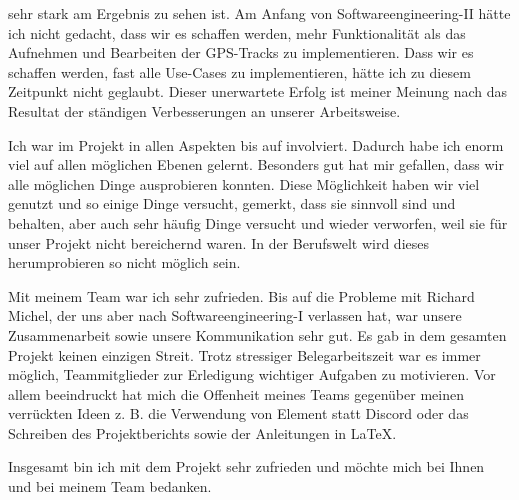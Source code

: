 \documentclass[10pt]{article}
\begin{document}
sehr stark am Ergebnis zu sehen ist. Am Anfang von Softwareengineering-II hätte ich nicht gedacht, dass wir es
schaffen werden, mehr Funktionalität als das Aufnehmen und Bearbeiten der GPS-Tracks zu implementieren.
Dass wir es schaffen werden, fast alle Use-Cases zu implementieren, hätte ich zu diesem Zeitpunkt nicht geglaubt.
Dieser unerwartete Erfolg ist meiner Meinung nach das Resultat der ständigen Verbesserungen an unserer Arbeitsweise.\par
\medskip
Ich war im Projekt in allen Aspekten bis auf  involviert.
Dadurch habe ich enorm viel auf allen möglichen Ebenen gelernt. Besonders gut hat mir gefallen, dass wir
alle möglichen Dinge ausprobieren konnten. Diese Möglichkeit haben wir viel genutzt und so einige Dinge versucht,
gemerkt, dass sie sinnvoll sind und behalten, aber auch sehr häufig Dinge versucht und wieder verworfen, weil sie für
unser Projekt nicht bereichernd waren.
In der Berufswelt wird dieses herumprobieren so nicht möglich sein.\par
\medskip
Mit meinem Team war ich sehr zufrieden. Bis auf die Probleme mit Richard Michel, der uns aber nach Softwareengineering-I
verlassen hat, war unsere Zusammenarbeit sowie unsere Kommunikation sehr gut. Es gab in dem gesamten Projekt keinen
einzigen Streit. Trotz stressiger Belegarbeitszeit war es
immer möglich, Teammitglieder zur Erledigung wichtiger Aufgaben zu motivieren. Vor allem beeindruckt hat mich die
Offenheit meines Teams gegenüber meinen verrückten Ideen z. B. die Verwendung von Element statt Discord oder
das Schreiben des Projektberichts sowie der Anleitungen in LaTeX.\par 
\medskip 
Insgesamt bin ich mit dem Projekt sehr zufrieden und möchte mich bei Ihnen und bei meinem Team bedanken.
\end{document}
